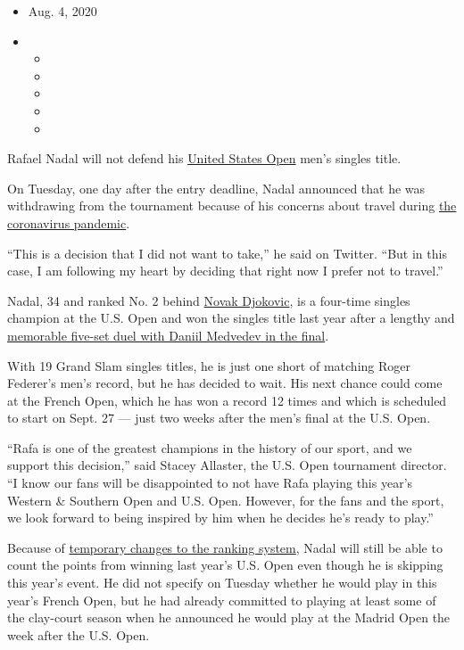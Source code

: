 \begin{itemize}
\item
  Aug. 4, 2020
\item
  \begin{itemize}
  \item
  \item
  \item
  \item
  \item
  \end{itemize}
\end{itemize}

Rafael Nadal will not defend his
\href{https://www.nytimes.com/2020/06/16/sports/us-open-tennis-cuomo.html}{United
States Open} men's singles title.

On Tuesday, one day after the entry deadline, Nadal announced that he
was withdrawing from the tournament because of his concerns about travel
during \href{https://www.nytimes.com/news-event/coronavirus}{the
coronavirus pandemic}.

``This is a decision that I did not want to take,'' he said on Twitter.
``But in this case, I am following my heart by deciding that right now I
prefer not to travel.''

Nadal, 34 and ranked No. 2 behind
\href{https://www.nytimes.com/2020/06/23/sports/tennis/novak-djokovic-coronavirus.html}{Novak
Djokovic}, is a four-time singles champion at the U.S. Open and won the
singles title last year after a lengthy and
\href{https://www.nytimes.com/2019/09/08/sports/tennis/us-open-rafael-nadal-daniil-medvedev.html}{memorable
five-set duel with Daniil Medvedev in the final}.

With 19 Grand Slam singles titles, he is just one short of matching
Roger Federer's men's record, but he has decided to wait. His next
chance could come at the French Open, which he has won a record 12 times
and which is scheduled to start on Sept. 27 --- just two weeks after the
men's final at the U.S. Open.

``Rafa is one of the greatest champions in the history of our sport, and
we support this decision,'' said Stacey Allaster, the U.S. Open
tournament director. ``I know our fans will be disappointed to not have
Rafa playing this year's Western \& Southern Open and U.S. Open.
However, for the fans and the sport, we look forward to being inspired
by him when he decides he's ready to play.''

Because of
\href{https://www.nytimes.com/2020/07/04/sports/tennis/tennis-rankings-coronavirus.html}{temporary
changes to the ranking system}, Nadal will still be able to count the
points from winning last year's U.S. Open even though he is skipping
this year's event. He did not specify on Tuesday whether he would play
in this year's French Open, but he had already committed to playing at
least some of the clay-court season when he announced he would play at
the Madrid Open the week after the U.S. Open.

